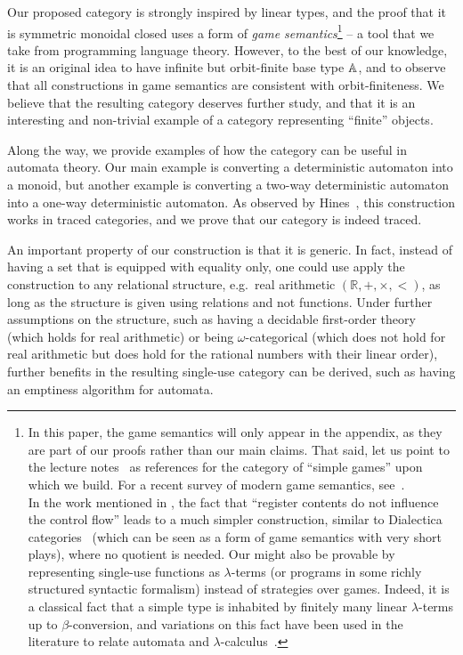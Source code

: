 Our proposed category is strongly inspired by linear types, and the proof that it is symmetric monoidal closed uses a form of \emph{game semantics}\footnote{In this paper, the game semantics will only appear in the appendix, as they are part of our proofs rather than our main claims. That said, let us point to the lecture notes~\cite{abramsky2013semantics,Hyland1997} as references for the category of ``simple games'' upon which we build. For a recent survey of modern game semantics, see~\cite{ClairambaultHDR}.\\
  In the work mentioned in , the fact that ``register contents do not influence the control flow'' leads to a much simpler construction, similar to Dialectica categories~\cite{PaivaDialectica} (which can be seen as a form of game semantics with very short plays), where no quotient is needed. Our  might also be provable by representing single-use functions as $\lambda$-terms (or programs in some richly structured syntactic formalism) instead of strategies over games. Indeed, it is a classical fact that a simple type is inhabited by finitely many linear $\lambda$-terms up to $\beta$-conversion, and variations on this fact have been used in the literature to relate automata and $\lambda$-calculus~\cite{IATLC,LambdaTransducer}.} -- a tool that we take from programming language theory. However, to the best of our knowledge, it is an original idea to have infinite but orbit-finite base type $\mathbb A$, and to observe that all constructions in game semantics are consistent with orbit-finiteness. We believe that the resulting category deserves further study, and that it is an interesting and non-trivial example of a category representing ``finite'' objects.

Along the way, we provide examples of how the category can be useful in automata theory. Our main example is converting a deterministic automaton into a monoid, but another example is converting a two-way deterministic automaton into a one-way deterministic automaton. As observed by Hines~\cite[Section 4]{hines2003categorical}, this construction works in traced categories, and we prove that our category is indeed traced. 

An important property of our construction is that it is generic. In fact, instead of having a set that is equipped with equality only, one could use apply the construction to any relational structure, e.g.~real arithmetic $(\mathbb R, +, \times, <)$, as long as the structure is given using relations and not functions. Under further assumptions on the structure, such as having a decidable first-order theory (which holds for real arithmetic) or being $\omega$-categorical (which does not hold for real arithmetic but does hold for the rational numbers with their linear order), further benefits in the resulting single-use category can be derived, such as having an emptiness algorithm for automata. 

